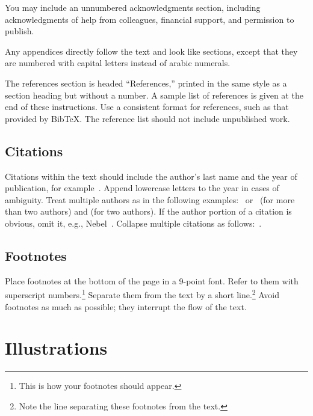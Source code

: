 \documentclass{article}
\begin{document}
You may include an unnumbered acknowledgments section, including
acknowledgments of help from colleagues, financial support, and
permission to publish.

Any appendices directly follow the text and look like sections, except
that they are numbered with capital letters instead of arabic
numerals.

The references section is headed ``References,'' printed in the same
style as a section heading but without a number. A sample list of
references is given at the end of these instructions. Use a consistent
format for references, such as that provided by Bib\TeX{}. The reference
list should not include unpublished work.

\subsection{Citations}

Citations within the text should include the author's last name and
the year of publication, for example~\cite{gottlob:nonmon}.  Append
lowercase letters to the year in cases of ambiguity.  Treat multiple
authors as in the following examples:~\cite{abelson-et-al:scheme}
or~\cite{bgf:Lixto} (for more than two authors) and
\cite{brachman-schmolze:kl-one} (for two authors).  If the author
portion of a citation is obvious, omit it, e.g.,
Nebel~.  Collapse multiple citations as
follows:~\cite{gls:hypertrees,levesque:functional-foundations}.
\nocite{abelson-et-al:scheme}
\nocite{bgf:Lixto}
\nocite{brachman-schmolze:kl-one}
\nocite{gottlob:nonmon}
\nocite{gls:hypertrees}
\nocite{levesque:functional-foundations}
\nocite{levesque:belief}
\nocite{nebel:jair-2000}

\subsection{Footnotes}

Place footnotes at the bottom of the page in a 9-point font.  Refer to
them with superscript numbers.\footnote{This is how your footnotes
should appear.} Separate them from the text by a short
line.\footnote{Note the line separating these footnotes from the
text.} Avoid footnotes as much as possible; they interrupt the flow of
the text.

\section{Illustrations}
\end{document}

